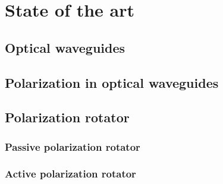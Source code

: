 \documentclass[../main.tex]{subfiles}
\begin{document}
	
	
\chapter{State of the art}

	\section{Optical waveguides}

	\section{Polarization in optical waveguides}

	\section{Polarization rotator}
	
		\subsection{Passive polarization rotator}
	
		\subsection{Active polarization rotator}
\end{document}
